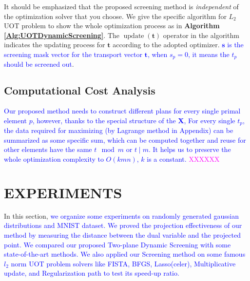\documentclass[twoside]{article}
\theoremstyle{plain}
\newcommand{\mat}[1]{\mathbf{#1}}
\renewcommand{\vec}[1]{\bm{#1}}
\newcommand{\changeXS}[1]{\textcolor{blue}{#1}}
\newcommand{\note}[1]{\textcolor{magenta}{#1}}
\begin{document}
It should be emphasized that the proposed screening method is {\it independent} of the optimization solver that you choose. We give the specific algorithm for $L_2$ UOT problem to show the whole optimization process as in {\bf Algorithm \ref{Alg:UOTDynamicScreening}}. The $\operatorname{update}(\vec{t})$ operator in the algorithm indicates the updating process for $\vec{t}$ according to the adopted optimizer. \changeXS{$\vec s$ is the screening mask vector for the transport vector $\vec t$, when $s_p = 0$, it means the $t_p$ should be screened out}.\\

\subsection{Computational Cost Analysis}
\changeXS{Our proposed method needs to construct different plans for every single primal element $p$, however, thanks to the special structure of the $\mat X$, For every single $t_p$, the data required for maximizing (by Lagrange method in Appendix) can be summarized as some specific sum, which can be computed together and reuse for other elements have the same $t \mod m $ or $t \mid m$. It helps us to preserve the whole optimization complexity to $O(kmn)$, $k$ is a constant.}
\note{XXXXXX}


\section{EXPERIMENTS}
\label{sec:exp}
In this section, \changeXS{we organize some experiments on randomly generated gaussian distributions and MNIST dataset. We proved the projection effectiveness of our method by measuring the distance between the dual variable and the projected point. We compared our proposed Two-plane Dynamic Screening with some state-of-the-art methods. We also applied our Screening method on some famous $l_2$ norm UOT problem solvers like FISTA, BFGS, Lasso(celer), Multiplicative update, and Regularization path to test its speed-up ratio.} 
\end{document}
